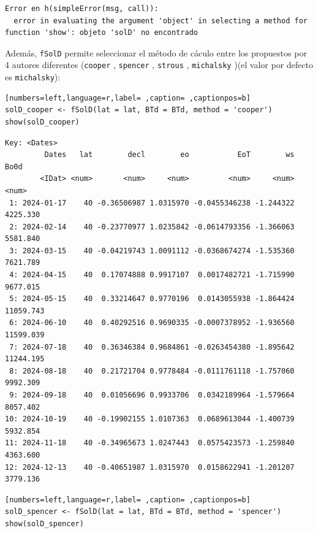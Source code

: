 \begin{verbatim}
Error en h(simpleError(msg, call)): 
  error in evaluating the argument 'object' in selecting a method for function 'show': objeto 'solD' no encontrado
\end{verbatim}


Además, \texttt{fSolD} permite seleccionar el método de cáculo entre los propuestos por 4 autores diferentes (\texttt{cooper} \cite{Cooper1969}, \texttt{spencer} \cite{Spencer1971}, \texttt{strous} \cite{Strous2011}, \texttt{michalsky} \cite{Michalsky1988})(el valor por defecto es \texttt{michalsky}):
\begin{lstlisting}[numbers=left,language=r,label= ,caption= ,captionpos=b]
solD_cooper <- fSolD(lat = lat, BTd = BTd, method = 'cooper')
show(solD_cooper)
\end{lstlisting}

\begin{verbatim}
Key: <Dates>
         Dates   lat        decl        eo           EoT        ws      Bo0d
        <IDat> <num>       <num>     <num>         <num>     <num>     <num>
 1: 2024-01-17    40 -0.36506987 1.0315970 -0.0455346238 -1.244322  4225.330
 2: 2024-02-14    40 -0.23770977 1.0235842 -0.0614793356 -1.366063  5581.840
 3: 2024-03-15    40 -0.04219743 1.0091112 -0.0368674274 -1.535360  7621.789
 4: 2024-04-15    40  0.17074888 0.9917107  0.0017482721 -1.715990  9677.015
 5: 2024-05-15    40  0.33214647 0.9770196  0.0143055938 -1.864424 11059.743
 6: 2024-06-10    40  0.40292516 0.9690335 -0.0007378952 -1.936560 11599.039
 7: 2024-07-18    40  0.36346384 0.9684861 -0.0263454380 -1.895642 11244.195
 8: 2024-08-18    40  0.21721704 0.9778484 -0.0111761118 -1.757060  9992.309
 9: 2024-09-18    40  0.01056696 0.9933706  0.0342189964 -1.579664  8057.402
10: 2024-10-19    40 -0.19902155 1.0107363  0.0689613044 -1.400739  5932.854
11: 2024-11-18    40 -0.34965673 1.0247443  0.0575423573 -1.259840  4363.600
12: 2024-12-13    40 -0.40651987 1.0315970  0.0158622941 -1.201207  3779.136
\end{verbatim}

\begin{lstlisting}[numbers=left,language=r,label= ,caption= ,captionpos=b]
solD_spencer <- fSolD(lat = lat, BTd = BTd, method = 'spencer')
show(solD_spencer)
\end{lstlisting}

